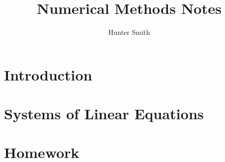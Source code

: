 \documentclass[11pt]{article}
\title{Numerical Methods Notes}
\date{}
\author{Hunter Smith}
\theoremstyle{definition}
\theoremstyle{plain}
\theoremstyle{remark}
\begin{document}
  \maketitle
  \tableofcontents
  \newpage

    \section{Introduction}
        
        

    \section{Systems of Linear Equations}
    	

    \section{Homework}
    
    

    \printindex
\end{document}

